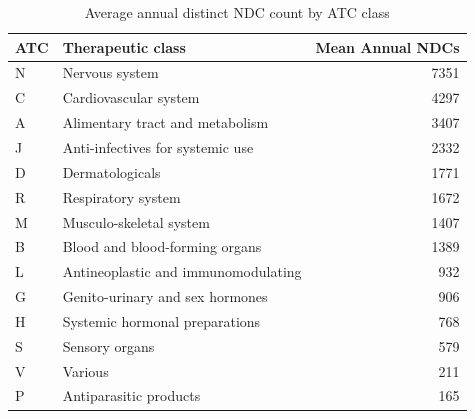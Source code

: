\begin{table}[!h]
\centering
\caption{\label{tab:class_substitutability}Average annual distinct NDC count by ATC class}
\centering
\begin{tabular*}{\linewidth}[t]{ll@{\extracolsep{\fill}}r}
\toprule
ATC & Therapeutic class & Mean Annual NDCs\\
\midrule
N & Nervous system & 7351\\
C & Cardiovascular system & 4297\\
A & Alimentary tract and metabolism & 3407\\
J & Anti-infectives for systemic use & 2332\\
D & Dermatologicals & 1771\\
R & Respiratory system & 1672\\
M & Musculo-skeletal system & 1407\\
B & Blood and blood-forming organs & 1389\\
L & Antineoplastic and immunomodulating & 932\\
G & Genito-urinary and sex hormones & 906\\
H & Systemic hormonal preparations & 768\\
S & Sensory organs & 579\\
V & Various & 211\\
P & Antiparasitic products & 165\\
\bottomrule
\end{tabular*}
\end{table}
